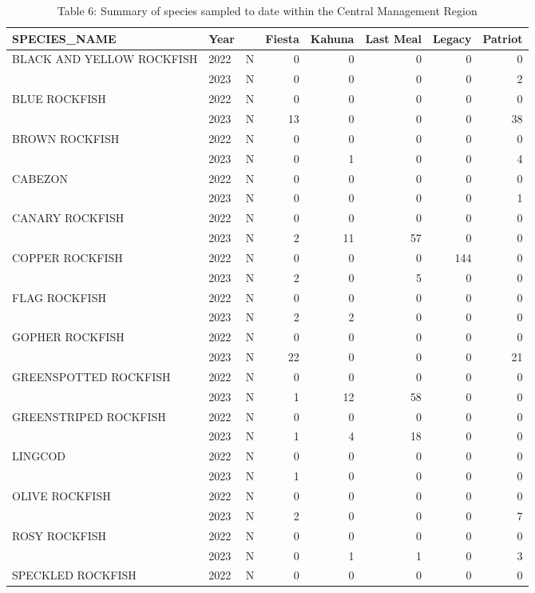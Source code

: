 \documentclass[
  letterpaper,
  DIV=11,
  numbers=noendperiod]{scrartcl}
\begin{document}
\begin{table}

\caption{Table 6: Summary of species sampled to date within the Central Management Region}
\centering
\begin{tabular}[t]{lllrrrrr}
\toprule
SPECIES\_NAME & Year &   & Fiesta & Kahuna & Last Meal & Legacy & Patriot\\
\midrule
BLACK AND YELLOW ROCKFISH & 2022 & N & 0 & 0 & 0 & 0 & 0\\
 & 2023 & N & 0 & 0 & 0 & 0 & 2\\
BLUE ROCKFISH & 2022 & N & 0 & 0 & 0 & 0 & 0\\
 & 2023 & N & 13 & 0 & 0 & 0 & 38\\
BROWN ROCKFISH & 2022 & N & 0 & 0 & 0 & 0 & 0\\
 & 2023 & N & 0 & 1 & 0 & 0 & 4\\
CABEZON & 2022 & N & 0 & 0 & 0 & 0 & 0\\
 & 2023 & N & 0 & 0 & 0 & 0 & 1\\
CANARY ROCKFISH & 2022 & N & 0 & 0 & 0 & 0 & 0\\
 & 2023 & N & 2 & 11 & 57 & 0 & 0\\
COPPER ROCKFISH & 2022 & N & 0 & 0 & 0 & 144 & 0\\
 & 2023 & N & 2 & 0 & 5 & 0 & 0\\
FLAG ROCKFISH & 2022 & N & 0 & 0 & 0 & 0 & 0\\
 & 2023 & N & 2 & 2 & 0 & 0 & 0\\
GOPHER ROCKFISH & 2022 & N & 0 & 0 & 0 & 0 & 0\\
 & 2023 & N & 22 & 0 & 0 & 0 & 21\\
GREENSPOTTED ROCKFISH & 2022 & N & 0 & 0 & 0 & 0 & 0\\
 & 2023 & N & 1 & 12 & 58 & 0 & 0\\
GREENSTRIPED ROCKFISH & 2022 & N & 0 & 0 & 0 & 0 & 0\\
 & 2023 & N & 1 & 4 & 18 & 0 & 0\\
LINGCOD & 2022 & N & 0 & 0 & 0 & 0 & 0\\
 & 2023 & N & 1 & 0 & 0 & 0 & 0\\
OLIVE ROCKFISH & 2022 & N & 0 & 0 & 0 & 0 & 0\\
 & 2023 & N & 2 & 0 & 0 & 0 & 7\\
ROSY ROCKFISH & 2022 & N & 0 & 0 & 0 & 0 & 0\\
 & 2023 & N & 0 & 1 & 1 & 0 & 3\\
SPECKLED ROCKFISH & 2022 & N & 0 & 0 & 0 & 0 & 0\\

\end{tabular}
\end{table}
\end{document}
